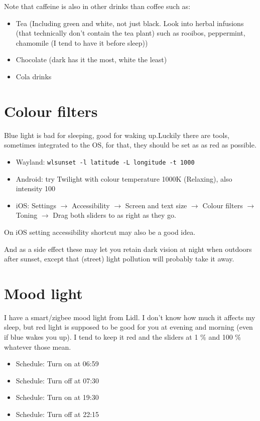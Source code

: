 \documentclass[a4paper]{boek3}
\begin{document}
Note that caffeine is also in other drinks than coffee such as:

\begin{itemize}
    \item Tea (Including green and white, not just black. Look into herbal infusions (that technically don't contain the tea plant) such as rooibos, peppermint, chamomile (I tend to have it before sleep))
    \item Chocolate (dark has it the most, white the least)
    \item Cola drinks
\end{itemize}

\chapter{Colour filters}

Blue light is bad for sleeping, good for waking up.Luckily there are tools, sometimes integrated to the OS, for that, they should be set as as red as possible.

\begin{itemize}
    \item Wayland: \texttt{wlsunset -l latitude -L longitude -t 1000}
    \item Android: try Twilight with colour temperature 1000K (Relaxing), also intensity 100 %
    \item iOS: Settings $\rightarrow$ Accessibility $\rightarrow$ Screen and text size $\rightarrow$ Colour filters $\rightarrow$ Toning $\rightarrow$ Drag both sliders to as right as they go.
\end{itemize}

On iOS setting accessibility shortcut may also be a good idea.

And as a side effect these may let you retain dark vision at night when outdoors after sunset, except that (street) light pollution will probably take it away.

\chapter{Mood light}

I have a smart/zigbee mood light from Lidl. I don't know how much it affects my sleep, but red light is supposed to be good for you at evening and morning (even if blue wakes you up).
I tend to keep it red and the sliders at 1 \% and 100 \% whatever those mean.

\begin{itemize}
    \item Schedule: Turn on at 06:59
    \item Schedule: Turn off at 07:30
    \item Schedule: Turn on at 19:30
    \item Schedule: Turn off at 22:15
\end{itemize}
\end{document}
